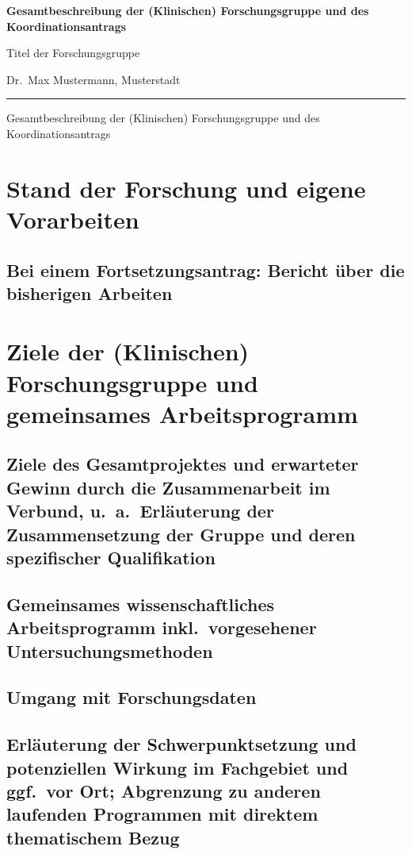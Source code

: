 \documentclass{scrartcl}
\newcommand{\spokesperson}{Dr.\ Max Mustermann, Musterstadt}
\newcommand{\project}{Titel der Forschungsgruppe}
\begin{document}
{\raggedright{} \normalsize \bfseries
	Gesamtbeschreibung der (Klinischen) Forschungsgruppe und des Koordinationsantrags \par
    \project{} \par
    \spokesperson{} \par
	\rule{\textwidth}{0.5pt} \par
	Gesamtbeschreibung der (Klinischen) Forschungsgruppe und des Koordinationsantrags
}

\section{Stand der Forschung und eigene Vorarbeiten}

\subsection{Bei einem Fortsetzungsantrag: Bericht über die bisherigen Arbeiten}

\section{Ziele der (Klinischen) Forschungsgruppe und gemeinsames Arbeitsprogramm}

\subsection{Ziele des Gesamtprojektes und erwarteter Gewinn durch die Zusammenarbeit im Verbund, u.\ a.\ Erläuterung der Zusammensetzung der Gruppe und deren spezifischer Qualifikation}

\subsection{Gemeinsames wissenschaftliches Arbeitsprogramm inkl.\ vorgesehener Untersuchungsmethoden}

\subsection{Umgang mit Forschungsdaten}

\subsection{Erläuterung der Schwerpunktsetzung und potenziellen Wirkung im Fachgebiet und ggf.\ vor Ort; Abgrenzung zu anderen laufenden Programmen mit direktem thematischem Bezug}
\end{document}
